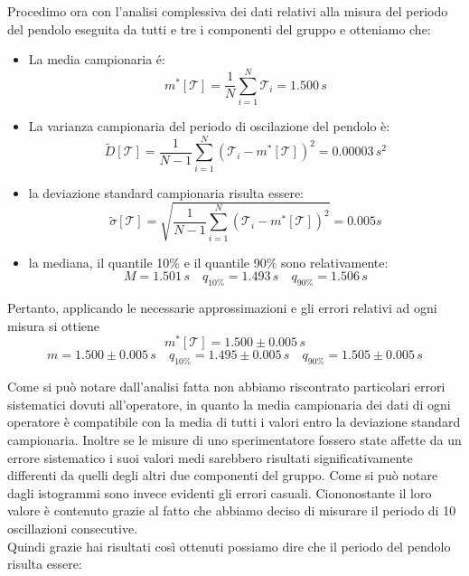 Procedimo ora con l'analisi complessiva dei dati relativi alla misura del
periodo del pendolo eseguita da tutti e tre i componenti del gruppo e otteniamo che:

\begin{itemize}
    \item{La media campionaria é:}
        \begin{equation}
            m^*[\mathcal{T}] = \frac{1}{N} \sum_{i=1}^{N} \mathcal{T}_i = 1.500\,s
        \end{equation} 

    \item{La varianza campionaria del periodo di oscilazione del pendolo è:}
        \begin{equation}
            \tilde{D}[\mathcal{T}] = \frac{1}{N - 1} \sum_{i=1}^{N} (\mathcal{T}_i - m^*[\mathcal{T}])^2 = 0.00003\,s^2
        \end{equation}

    \item{la deviazione standard campionaria risulta essere:}
        \begin{equation}
            \tilde{\sigma}[\mathcal{T}] = \sqrt{\frac{1}{N - 1} \sum_{i=1}^{N} (\mathcal{T}_i - m^*[\mathcal{T}])^2} = 0.005 s
        \end{equation}

    \item{la mediana, il quantile 10\% e il quantile 90\% sono relativamente:}
        \begin{equation*}
            M = 1.501\,s \quad
            q_{10\%} = 1.493\,s \quad
            q_{90\%} = 1.506\,s
        \end{equation*}
\end{itemize}

Pertanto, applicando le necessarie approssimazioni e gli errori relativi ad ogni misura si ottiene
\begin{equation*}
m^*[\mathcal{T}] = 1.500 \pm 0.005\,s
\end{equation*}
\begin{equation*}
m = 1.500 \pm 0.005\,s  \quad
q_{10\%} = 1.495 \pm 0.005\,s \quad
q_{90\%} = 1.505 \pm 0.005\,s
\end{equation*}

Come si può notare dall'analisi fatta non abbiamo riscontrato particolari errori sistematici dovuti all'operatore, in quanto la media campionaria dei dati di ogni operatore è compatibile con la media di tutti i valori entro la deviazione standard campionaria. Inoltre se le misure di uno sperimentatore fossero state affette da un errore sistematico i suoi valori medi sarebbero risultati significativamente differenti da quelli degli altri due componenti del gruppo.
Come si può notare dagli istogrammi sono invece evidenti gli errori casuali. Ciononostante il loro valore è contenuto grazie al fatto che abbiamo deciso di misurare il periodo di 10 oscillazioni consecutive.\\
Quindi grazie hai risultati così ottenuti possiamo dire che il periodo del pendolo risulta essere:

